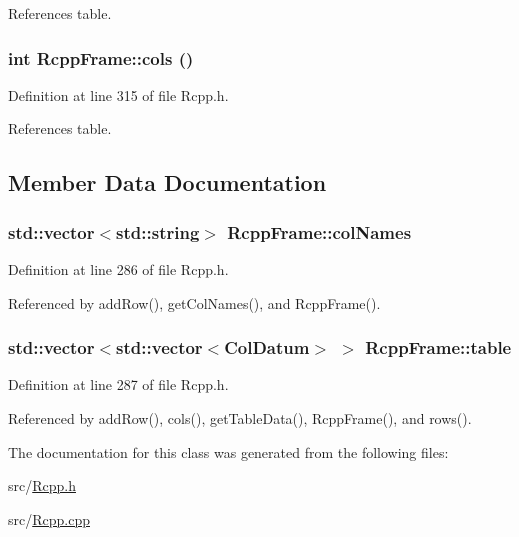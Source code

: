 References table.\hypertarget{classRcppFrame_ac33f787068fe1bc6f97b2b4e08c9c5d}{
\subsubsection[cols]{\setlength{\rightskip}{0pt plus 5cm}int RcppFrame::cols ()}}
\label{classRcppFrame_ac33f787068fe1bc6f97b2b4e08c9c5d}




Definition at line 315 of file Rcpp.h.

References table.

\subsection{Member Data Documentation}
\hypertarget{classRcppFrame_9b549d377248896848b6abcb8df64f82}{
\subsubsection[colNames]{\setlength{\rightskip}{0pt plus 5cm}std::vector$<$std::string$>$ {\bf RcppFrame::colNames}}}
\label{classRcppFrame_9b549d377248896848b6abcb8df64f82}




Definition at line 286 of file Rcpp.h.

Referenced by addRow(), getColNames(), and RcppFrame().\hypertarget{classRcppFrame_4de0bda5c0df650b2447a4c029af0302}{
\subsubsection[table]{\setlength{\rightskip}{0pt plus 5cm}std::vector$<$std::vector$<${\bf ColDatum}$>$ $>$ {\bf RcppFrame::table}}}
\label{classRcppFrame_4de0bda5c0df650b2447a4c029af0302}




Definition at line 287 of file Rcpp.h.

Referenced by addRow(), cols(), getTableData(), RcppFrame(), and rows().

The documentation for this class was generated from the following files:\begin{CompactItemize}
\item 
src/\hyperlink{Rcpp_8h}{Rcpp.h}\item 
src/\hyperlink{Rcpp_8cpp}{Rcpp.cpp}\end{CompactItemize}
